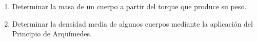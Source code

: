 \documentclass[../main.tex]{subfiles}
\begin{document}
\begin{enumerate}
    \item Determinar la masa de un cuerpo a partir del torque que produce su peso.
    \item Determinar la densidad media de algunos cuerpos mediante la aplicación del
    Principio de Arquímedes.
\end{enumerate}
\end{document}
